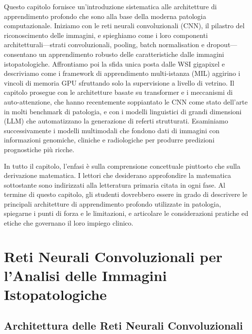 Questo capitolo fornisce un'introduzione sistematica alle architetture di apprendimento profondo che sono alla base della moderna patologia computazionale. Iniziamo con le reti neurali convoluzionali (CNN), il pilastro del riconoscimento delle immagini, e spieghiamo come i loro componenti architetturali---strati convoluzionali, pooling, batch normalisation e dropout---consentano un apprendimento robusto delle caratteristiche dalle immagini istopatologiche. Affrontiamo poi la sfida unica posta dalle WSI gigapixel e descriviamo come i framework di apprendimento multi-istanza (MIL) aggirino i vincoli di memoria GPU sfruttando solo la supervisione a livello di vetrino. Il capitolo prosegue con le architetture basate su transformer e i meccanismi di auto-attenzione, che hanno recentemente soppiantato le CNN come stato dell'arte in molti benchmark di patologia, e con i modelli linguistici di grandi dimensioni (LLM) che automatizzano la generazione di referti strutturati. Esaminiamo successivamente i modelli multimodali che fondono dati di immagini con informazioni genomiche, cliniche e radiologiche per produrre predizioni prognostiche più ricche. 

In tutto il capitolo, l'enfasi è sulla comprensione concettuale piuttosto che sulla derivazione matematica. I lettori che desiderano approfondire la matematica sottostante sono indirizzati alla letteratura primaria citata in ogni fase. Al termine di questo capitolo, gli studenti dovrebbero essere in grado di descrivere le principali architetture di apprendimento profondo utilizzate in patologia, spiegarne i punti di forza e le limitazioni, e articolare le considerazioni pratiche ed etiche che governano il loro impiego clinico.

\section{Reti Neurali Convoluzionali per l'Analisi delle Immagini Istopatologiche}
\label{sec:ch4_cnn}

\subsection{Architettura delle Reti Neurali Convoluzionali}

